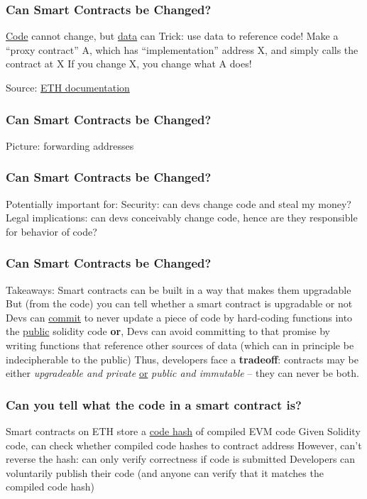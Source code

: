 \documentclass[]{beamer}
\begin{document}
\begin{frame}
\frametitle{Can Smart Contracts be Changed?}

\pause
\bi
\m \ul{Code} cannot change, but \ul{data} can 
\m Trick: use data to reference code! 
\m Make a ``proxy contract'' A, which has ``implementation'' address X, and simply calls the contract at X
\m If you change X, you change what A does!
\ei

Source: \href{https://ethereum.org/en/developers/docs/smart-contracts/upgrading/}{ETH documentation}

\end{frame}

\begin{frame}
\frametitle{Can Smart Contracts be Changed?}

Picture: forwarding addresses

\end{frame}

\begin{frame}
\frametitle{Can Smart Contracts be Changed?}

Potentially important for: 
\bi
\m Security: can devs change code and steal my money? \pause
\m Legal implications: can devs conceivably change code, hence are they responsible for behavior of code? 
\ei

\end{frame}


\begin{frame}
\frametitle{Can Smart Contracts be Changed?}

Takeaways: 
\bi
\m Smart contracts can be built in a way that makes them upgradable
\m But (from the code) you can tell whether a smart contract is upgradable or not
\m Devs can \ul{commit} to never update a piece of code by hard-coding functions into the \ul{public} solidity code \pause 
\m \textbf{or}, Devs can avoid committing to that promise by writing functions that reference other sources of data (which can in principle be indecipherable to the public) 
\m Thus, developers face a \textbf{tradeoff}: contracts may be either \emph{upgradeable and private} \underline{or} \emph{public and immutable} -- they can never be both. 
\ei

\end{frame}

\begin{frame}
\frametitle{Can you tell what the code in a smart contract is?}

\pause
\bi
\m Smart contracts on ETH store a \ul{code hash} of compiled EVM code
\m Given Solidity code, can check whether compiled code hashes to contract address
\m However, can't reverse the hash: can only verify correctness if code is submitted
\m Developers can voluntarily publish their code (and anyone can verify that it matches the compiled code hash)
\ei

\end{frame}
\end{document}
